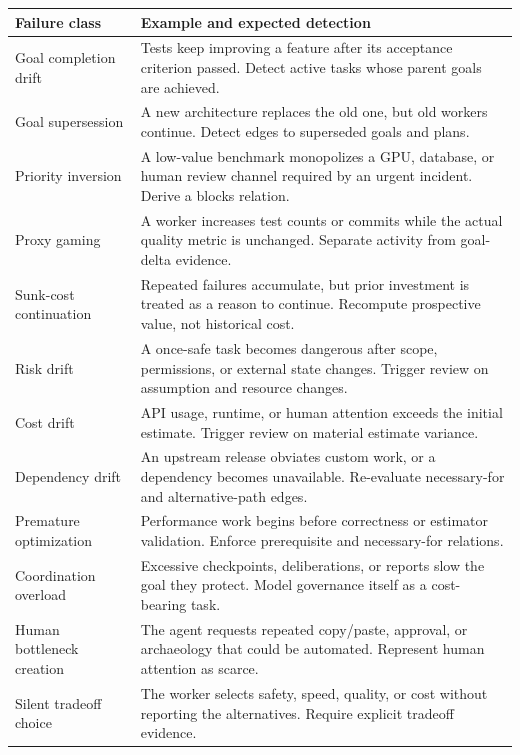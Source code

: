 \documentclass[11pt,letterpaper]{article}
\begin{document}
\begin{longtable}{p{}p{}}
\toprule
Failure class & Example and expected detection \\
\midrule
\endhead
Goal completion drift & Tests keep improving a feature after its acceptance
criterion passed. Detect active tasks whose parent goals are achieved. \\
Goal supersession & A new architecture replaces the old one, but old workers
continue. Detect edges to superseded goals and plans. \\
Priority inversion & A low-value benchmark monopolizes a GPU, database, or
human review channel required by an urgent incident. Derive a blocks relation. \\
Proxy gaming & A worker increases test counts or commits while the actual
quality metric is unchanged. Separate activity from goal-delta evidence. \\
Sunk-cost continuation & Repeated failures accumulate, but prior investment is
treated as a reason to continue. Recompute prospective value, not historical cost. \\
Risk drift & A once-safe task becomes dangerous after scope, permissions, or
external state changes. Trigger review on assumption and resource changes. \\
Cost drift & API usage, runtime, or human attention exceeds the initial
estimate. Trigger review on material estimate variance. \\
Dependency drift & An upstream release obviates custom work, or a dependency
becomes unavailable. Re-evaluate necessary-for and alternative-path edges. \\
Premature optimization & Performance work begins before correctness or
estimator validation. Enforce prerequisite and necessary-for relations. \\
Coordination overload & Excessive checkpoints, deliberations, or reports slow
the goal they protect. Model governance itself as a cost-bearing task. \\
Human bottleneck creation & The agent requests repeated copy/paste, approval,
or archaeology that could be automated. Represent human attention as scarce. \\
Silent tradeoff choice & The worker selects safety, speed, quality, or cost
without reporting the alternatives. Require explicit tradeoff evidence. \\
\bottomrule
\end{longtable}
\end{document}
